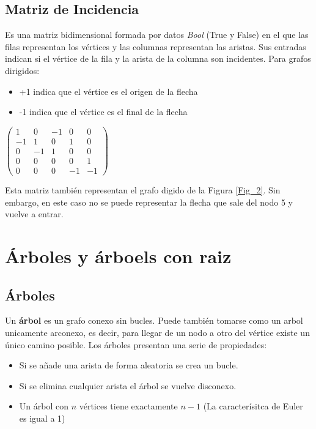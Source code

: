 \documentclass[11pt]{article}
\theoremstyle{plain}
\begin{document}
        \subsection{Matriz de Incidencia} %
        \label{sub:matriz_de_incidencia}
            Es una matriz bidimensional formada por datos \textit{Bool} (True y False) en el que las filas representan los vértices y las columnas representan las aristas. Sus entradas indican si el vértice de la fila y la arista de la columna son incidentes. Para grafos dirigidos:
            \begin{itemize}
                \item +1 indica que el vértice es el origen de la flecha
                \item -1 indica que el vértice es el final de la flecha
            \end{itemize}
            \begin{center}
                $\begin{pmatrix} 
                    1 & 0 & -1 & 0 & 0\\
                    -1 & 1 & 0 & 1 & 0\\
                    0 & -1 & 1 & 0 & 0\\
                    0 & 0 & 0 & 0 & 1\\
                    0 & 0 & 0 & -1 & -1    
                \end{pmatrix}$ 
            \end{center}
            Esta matriz también representan el grafo digido de la Figura \ref{Fig_2}. Sin embargo, en este caso no se puede representar la flecha que sale del nodo 5 y vuelve a entrar.         
    \section{Árboles y árboels con raiz} %
    \label{sec:árboles_y_árboels_con_raiz}
        \subsection{Árboles} %
        \label{sub:árboles}
            Un \textbf{árbol} es un grafo conexo sin bucles. Puede también tomarse como un arbol unicamente arconexo, es decir, para llegar de un nodo a otro del vértice existe un único camino posible. Los árboles presentan una serie de propiedades:
            \begin{itemize}
                \item Si se añade una arista de forma aleatoria se crea un bucle.
                \item Si se elimina cualquier arista el árbol se vuelve disconexo.
                \item Un árbol con $n$ vértices tiene exactamente $n-1$ (La caracterísitca de Euler es igual a 1)
            \end{itemize}
\end{document}
